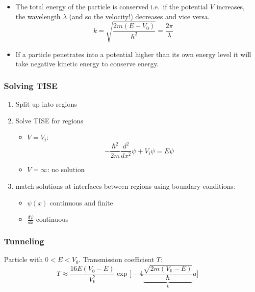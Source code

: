 \begin{itemize}
    \item The total energy of the particle is conserved i.e.\ if the potential $V$ increases, the wavelength $\lambda$ (and so the velocity!) decreases and vice versa.
          \noindent\begin{equation*}
              k=\sqrt{\frac{2m(E-V_0)}{\hbar^2}} = \frac{2\pi}{\lambda}
          \end{equation*}
    \item If a particle penetrates into a potential higher than its own energy level it will take negative kinetic energy to conserve energy.
\end{itemize}

\subsubsection{Solving TISE}
\begin{enumerate}
    \item Split up into regions
    \item Solve TISE for regions
          \begin{itemize}
              \item $V=V_i$:
                    \noindent\begin{equation*}
                        -\frac{\hbar^2}{2m}\frac{d^2}{dx^2} \psi + V_i\psi=E\psi
                    \end{equation*}
              \item $V=\infty$: no solution
          \end{itemize}
    \item match solutions at interfaces between regions using boundary conditions:
          \begin{itemize}
              \item $\psi(x)$ continuous and finite
              \item $\frac{d\psi}{dx}$ continuous
          \end{itemize}
\end{enumerate}

\subsubsection{Tunneling}
Particle with $0<E<V_0$. Transmission coefficient $T$:
\noindent\begin{equation*}
    T\approx\frac{16E(V_0-E)}{V_0^2}\exp\Biggl[-4 \underbrace{\frac{\sqrt{2m(V_0-E)}}{\hbar}}_{k} a\Biggr]
\end{equation*}
